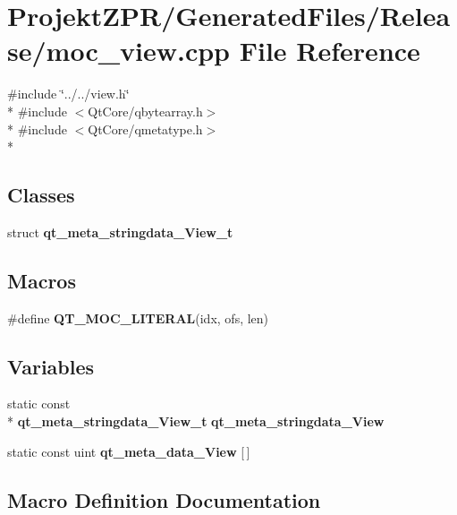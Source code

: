 \section{Projekt\-Z\-P\-R/\-Generated\-Files/\-Release/moc\-\_\-view.cpp File Reference}
\label{_release_2moc__view_8cpp}
{\ttfamily \#include \char`\"{}../../view.\-h\char`\"{}}\\*
{\ttfamily \#include $<$Qt\-Core/qbytearray.\-h$>$}\\*
{\ttfamily \#include $<$Qt\-Core/qmetatype.\-h$>$}\\*
\subsection*{Classes}
\begin{DoxyCompactItemize}
\item 
struct {\bf qt\-\_\-meta\-\_\-stringdata\-\_\-\-View\-\_\-t}
\end{DoxyCompactItemize}
\subsection*{Macros}
\begin{DoxyCompactItemize}
\item 
\#define {\bf Q\-T\-\_\-\-M\-O\-C\-\_\-\-L\-I\-T\-E\-R\-A\-L}(idx, ofs, len)
\end{DoxyCompactItemize}
\subsection*{Variables}
\begin{DoxyCompactItemize}
\item 
static const \\*
{\bf qt\-\_\-meta\-\_\-stringdata\-\_\-\-View\-\_\-t} {\bf qt\-\_\-meta\-\_\-stringdata\-\_\-\-View}
\item 
static const uint {\bf qt\-\_\-meta\-\_\-data\-\_\-\-View} [$\,$]
\end{DoxyCompactItemize}


\subsection{Macro Definition Documentation}
